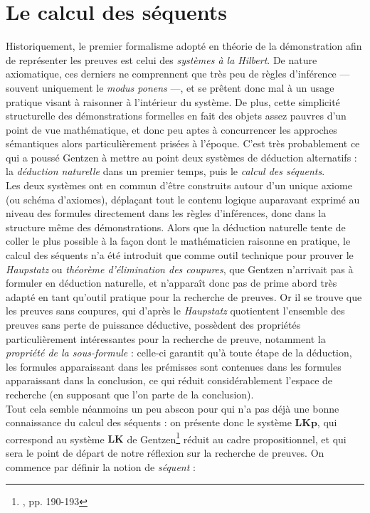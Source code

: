 \documentclass[12pt]{report}
\begin{document}
\section{Le calcul des séquents}

Historiquement, le premier formalisme adopté en théorie de la démonstration afin de représenter les preuves est celui des \emph{systèmes à la Hilbert}. De nature axiomatique, ces derniers ne comprennent que très peu de règles d'inférence --- souvent uniquement le \textit{modus ponens} ---, et se prêtent donc mal à un usage pratique visant à raisonner à l'intérieur du système. De plus, cette simplicité structurelle des démonstrations formelles en fait des objets assez pauvres d'un point de vue mathématique, et donc peu aptes à concurrencer les approches sémantiques alors particulièrement prisées à l'époque. C'est très probablement ce qui a poussé Gentzen à mettre au point deux systèmes de déduction alternatifs : la \emph{déduction naturelle} dans un premier temps, puis le \emph{calcul des séquents}.\\

Les deux systèmes ont en commun d'être construits autour d'un unique axiome (ou schéma d'axiomes), déplaçant tout le contenu logique auparavant exprimé au niveau des formules directement dans les règles d'inférences, donc dans la structure même des démonstrations. Alors que la déduction naturelle tente de coller le plus possible à la façon dont le mathématicien raisonne en pratique, le calcul des séquents n'a été introduit que comme outil technique pour prouver le \textit{Haupstatz} ou \emph{théorème d'élimination des coupures}, que Gentzen n'arrivait pas à formuler en déduction naturelle, et n'apparaît donc pas de prime abord très adapté en tant qu'outil pratique pour la recherche de preuves. Or il se trouve que les preuves sans coupures, qui d'après le \textit{Haupstatz} quotientent l'ensemble des preuves sans perte de puissance déductive, possèdent des propriétés particulièrement intéressantes pour la recherche de preuve, notamment la \emph{propriété de la sous-formule} : celle-ci garantit qu'à toute étape de la déduction, les formules apparaissant dans les prémisses sont contenues dans les formules apparaissant dans la conclusion, ce qui réduit considérablement l'espace de recherche (en supposant que l'on parte de la conclusion).\\

Tout cela semble néanmoins un peu abscon pour qui n'a pas déjà une bonne connaissance du calcul des séquents : on présente donc le système $\mathbf{LKp}$, qui correspond au système $\mathbf{LK}$ de Gentzen\footnote{\cite{Gen35}, pp. 190-193} réduit au cadre propositionnel, et qui sera le point de départ de notre réflexion sur la recherche de preuves. On commence par définir la notion de \emph{séquent} :
\end{document}
